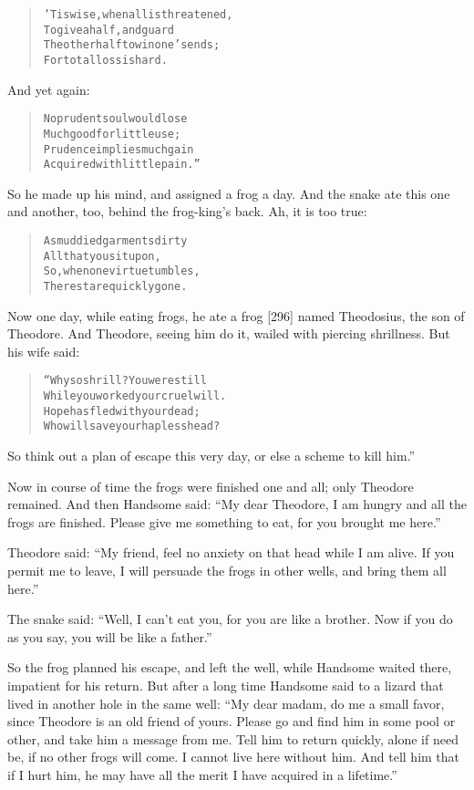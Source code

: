 \documentclass[article, twoside, 14pt]{memoir}
\renewenvironment{verbatim}{%
\begin{quote}%
\vskip -10pt%
\begin{alltt}\normalfont\large}{\end{alltt}%
\end{quote}%
\vskip -10pt
} %
\begin{document}
\begin{verbatim}
'Tis wise, when all is threatened,
    To give a half, and guard
The other half to win one's ends;
    For total loss is hard.
\end{verbatim}
And yet again:

\begin{verbatim}
No prudent soul would lose
Much good for little use;
Prudence implies much gain
Acquired with little pain.”
\end{verbatim}
So he made up his mind, and assigned a frog a day. And the snake
ate this one and another, too, behind the frog-king's back. Ah, it
is too true:

\begin{verbatim}
As muddied garments dirty
    All that you sit upon,
So, when one virtue tumbles,
    The rest are quickly gone.
\end{verbatim}
Now one day, while eating frogs, he ate a frog [296] named
Theodosius, the son of Theodore. And Theodore, seeing him do it,
wailed with piercing shrillness. But his wife said:

\begin{verbatim}
“Why so shrill? You were still
While you worked your cruel will.
Hope has fled with your dead;
Who will save your hapless head?
\end{verbatim}
So think out a plan of escape this very day, or else a scheme to
kill him.”

Now in course of time the frogs were finished one and all; only
Theodore remained. And then Handsome said:
``My dear Theodore, I am hungry and all the frogs are finished. Please give me something to eat, for you brought me here.''

Theodore said:
``My friend, feel no anxiety on that head while I am alive. If you permit me to leave, I will persuade the frogs in other wells, and bring them all here.''

The snake said:
``Well, I can't eat you, for you are like a brother. Now if you do as you say, you will be like a father.''

So the frog planned his escape, and left the well, while Handsome
waited there, impatient for his return. But after a long time
Handsome said to a lizard that lived in another hole in the same
well:
``My dear madam, do me a small favor, since Theodore is an old friend of yours. Please go and find him in some pool or other, and take him a message from me. Tell him to return quickly, alone if need be, if no other frogs will come. I cannot live here without him. And tell him that if I hurt him, he may have all the merit I have acquired in a lifetime.''
\end{document}
